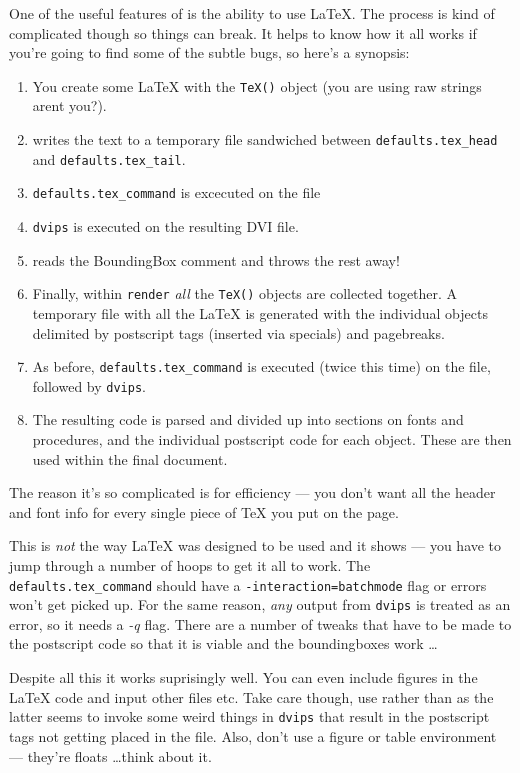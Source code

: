 \documentclass[a4paper]{book}
\begin{document}
One of the useful features of \pyscript is the ability to use \LaTeX.
The process is kind of complicated though so things can break. It helps
to know how it all works if you're going to find some of the subtle bugs,
so here's a synopsis:
\begin{enumerate}
\item You create some \LaTeX{} with the \Verb|TeX()| object (you are using
  raw strings arent you?).
\item \pyscript writes the text to a temporary file sandwiched
  between \Verb|defaults.tex_head| and \Verb|defaults.tex_tail|. 
\item \Verb|defaults.tex_command| is excecuted on the file
\item \Verb|dvips| is executed on the resulting DVI file.
\item \pyscript reads the BoundingBox comment and throws the rest away!
\item Finally, within \Verb|render| \emph{all} the \Verb|TeX()|
  objects are collected together. A temporary file with all the \LaTeX{}
  is generated with the individual objects delimited by postscript
  tags (inserted via specials) and pagebreaks.
\item As before, \Verb|defaults.tex_command| is executed (twice this
  time) on the file, followed by \Verb|dvips|.
\item The resulting code is parsed and divided up into sections on
  fonts and procedures, and the individual postscript code for each
  object. These are then used within the final document.
\end{enumerate}
The reason it's so complicated is for efficiency --- you don't want all the
header and font info for every single piece of \TeX{} you put on the page.

This is \emph{not} the way \LaTeX{} was designed to be used and it
shows --- you have to jump through a number of hoops to get it all to
work. The \Verb|defaults.tex_command| should have a
\Verb|-interaction=batchmode| flag or errors won't get picked up. For
the same reason, \emph{any} output from \Verb|dvips| is treated as an
error, so it needs a \emph{-q} flag. There are a number of tweaks that
have to be made to the postscript code so that it is viable and the
boundingboxes work \ldots

Despite all this it works suprisingly well. You can even include
figures in the \LaTeX{} code and input other files etc. Take care
though, use \Verb|| rather than \Verb|| as the latter
seems to invoke some weird things in \Verb|dvips| that result in the
postscript tags not getting placed in the file. Also, don't use a figure
or table environment --- they're floats \ldots think about it.
\end{document}
